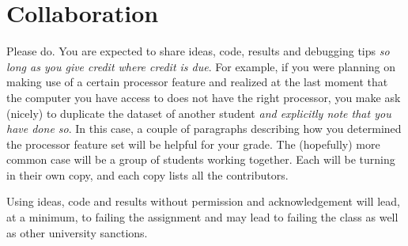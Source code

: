 \documentclass{tufte-handout}
\begin{document}
\section{Collaboration}
Please do.  You are expected to share ideas, code, results and debugging tips 
\textit{so long as you give credit where credit is due}. For example, if you were
planning on making use of a certain processor feature and realized at the last 
moment that the computer you have access to does not have the right processor,
you make ask (nicely) to duplicate the dataset of another student \textit{and explicitly
note that you have done so}.  In this case, a couple of paragraphs describing
how you determined the processor feature set will be helpful for your grade.
The (hopefully) more common case will be a group of students working together.  
Each will be turning in their own copy, and each copy lists all the contributors.

Using ideas, code and results without permission and acknowledgement will lead,
at a minimum, to failing the assignment and may lead to failing the class as well as
other university sanctions.  





\end{document}
